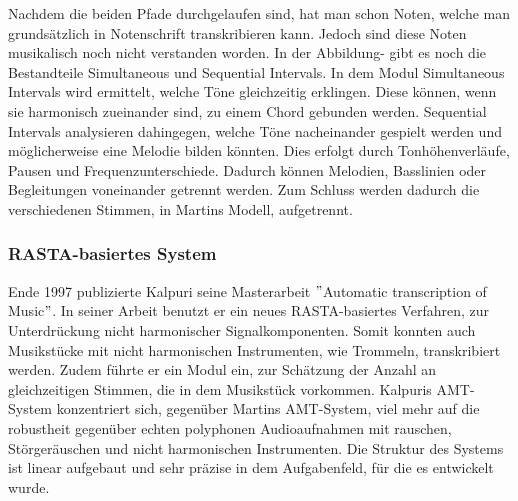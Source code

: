 Nachdem die beiden Pfade durchgelaufen sind, hat man schon Noten,
welche man grundsätzlich in Notenschrift transkribieren kann.
Jedoch sind diese Noten musikalisch noch nicht verstanden worden.
In der Abbildung- gibt es noch die Bestandteile Simultaneous und Sequential Intervals.
In dem Modul Simultaneous Intervals wird ermittelt, welche Töne gleichzeitig erklingen.
Diese können, wenn sie harmonisch zueinander sind, zu einem Chord gebunden werden.
Sequential Intervals analysieren dahingegen, welche Töne nacheinander gespielt werden und
möglicherweise eine Melodie bilden könnten.
Dies erfolgt durch Tonhöhenverläufe, Pausen und Frequenzunterschiede.
Dadurch können Melodien, Basslinien oder Begleitungen voneinander getrennt werden.
Zum Schluss werden dadurch die verschiedenen Stimmen, in Martins Modell, aufgetrennt.

\subsubsection{RASTA-basiertes System}
Ende 1997 publizierte Kalpuri seine Masterarbeit \("\)Automatic transcription of Music\("\).
\cite{klapuri1998automatic}
In seiner Arbeit benutzt er ein neues RASTA-basiertes Verfahren, zur Unterdrückung nicht harmonischer Signalkomponenten.
Somit konnten auch Musikstücke mit nicht harmonischen Instrumenten, wie Trommeln, transkribiert werden.
Zudem führte er ein Modul ein, zur Schätzung der Anzahl an gleichzeitigen Stimmen, die in dem Musikstück vorkommen.
Kalpuris AMT-System konzentriert sich, gegenüber Martins AMT-System, viel mehr auf die robustheit gegenüber
echten polyphonen Audioaufnahmen mit rauschen, Störgeräuschen und nicht harmonischen Instrumenten.
Die Struktur des Systems ist linear aufgebaut und sehr präzise in dem Aufgabenfeld, für die es entwickelt wurde.

\begin{center}
    \vspace{1em}
    \vspace{1em}
\end{center}

